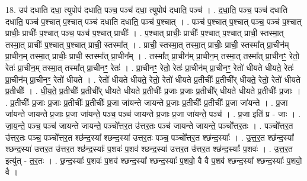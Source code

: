 \documentclass[17pt]{extarticle}
\begin{document}
18. उप॑ दधाति दधा॒ त्युपोप॑ दधाति॒ पञ्च॒ पञ्च॑ दधा॒ त्युपोप॑ दधाति॒ पञ्च॑ । . द॒धा॒ति॒ पञ्च॒ पञ्च॑ दधाति दधाति॒ पञ्च॑ प॒श्चात् प॒श्चात् पञ्च॑ दधाति दधाति॒ पञ्च॑ प॒श्चात् । . पञ्च॑ प॒श्चात् प॒श्चात् पञ्च॒ पञ्च॑ प॒श्चात् प्राचीः॒ प्राचीः᳚ प॒श्चात् पञ्च॒ पञ्च॑ प॒श्चात् प्राचीः᳚ । . प॒श्चात् प्राचीः॒ प्राचीः᳚ प॒श्चात् प॒श्चात् प्राची॒ स्तस्मा॒त् तस्मा॒त् प्राचीः᳚ प॒श्चात् प॒श्चात् प्राची॒ स्तस्मा᳚त् । . प्राची॒ स्तस्मा॒त् तस्मा॒त् प्राचीः॒ प्राची॒ स्तस्मा᳚त् प्रा॒चीन॑म् प्रा॒चीन॒म् तस्मा॒त् प्राचीः॒ प्राची॒ स्तस्मा᳚त् प्रा॒चीन᳚म् । . तस्मा᳚त् प्रा॒चीन॑म् प्रा॒चीन॒म् तस्मा॒त् तस्मा᳚त् प्रा॒चीनꣳ॒॒ रेतो॒ रेतः॑ प्रा॒चीन॒म् तस्मा॒त् तस्मा᳚त् प्रा॒चीनꣳ॒॒ रेतः॑ । . प्रा॒चीनꣳ॒॒ रेतो॒ रेतः॑ प्रा॒चीन॑म् प्रा॒चीनꣳ॒॒ रेतो॑ धीयते धीयते॒ रेतः॑ प्रा॒चीन॑म् प्रा॒चीनꣳ॒॒ रेतो॑ धीयते । . रेतो॑ धीयते धीयते॒ रेतो॒ रेतो॑ धीयते प्र॒तीचीः᳚ प्र॒तीची᳚र् धीयते॒ रेतो॒ रेतो॑ धीयते प्र॒तीचीः᳚ । . धी॒य॒ते॒ प्र॒तीचीः᳚ प्र॒तीची᳚र् धीयते धीयते प्र॒तीचीः᳚ प्र॒जाः प्र॒जाः प्र॒तीची᳚र् धीयते धीयते प्र॒तीचीः᳚ प्र॒जाः । . प्र॒तीचीः᳚ प्र॒जाः प्र॒जाः प्र॒तीचीः᳚ प्र॒तीचीः᳚ प्र॒जा जा॑यन्ते जायन्ते प्र॒जाः प्र॒तीचीः᳚ प्र॒तीचीः᳚ प्र॒जा जा॑यन्ते । . प्र॒जा जा॑यन्ते जायन्ते प्र॒जाः प्र॒जा जा॑यन्ते॒ पञ्च॒ पञ्च॑ जायन्ते प्र॒जाः प्र॒जा जा॑यन्ते॒ पञ्च॑ । . प्र॒जा इति॑ प्र - जाः । . जा॒य॒न्ते॒ पञ्च॒ पञ्च॑ जायन्ते जायन्ते॒ पञ्चो᳚त्तर॒त उ॑त्तर॒तः पञ्च॑ जायन्ते जायन्ते॒ पञ्चो᳚त्तर॒तः । . पञ्चो᳚त्तर॒त उ॑त्तर॒तः पञ्च॒ पञ्चो᳚त्तर॒त श्छ॑न्द॒स्या᳚ श्छन्द॒स्या॑ उत्तर॒तः पञ्च॒ पञ्चो᳚त्तर॒त श्छ॑न्द॒स्याः᳚ । . उ॒त्त॒र॒त श्छ॑न्द॒स्या᳚ श्छन्द॒स्या॑ उत्तर॒त उ॑त्तर॒त श्छ॑न्द॒स्याः᳚ प॒शवः॑ प॒शव॑ श्छन्द॒स्या॑ उत्तर॒त उ॑त्तर॒त श्छ॑न्द॒स्याः᳚ प॒शवः॑ । . उ॒त्त॒र॒त इत्यु॑त् - त॒र॒तः । . छ॒न्द॒स्याः᳚ प॒शवः॑ प॒शव॑ श्छन्द॒स्या᳚ श्छन्द॒स्याः᳚ प॒शवो॒ वै वै प॒शव॑ श्छन्द॒स्या᳚ श्छन्द॒स्याः᳚ प॒शवो॒ वै । \newline
\end{document}
